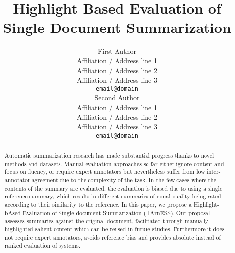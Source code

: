 \documentclass[11pt,a4paper]{article}
\title{Highlight Based Evaluation of Single Document Summarization}
\author{First Author \\
  Affiliation / Address line 1 \\
  Affiliation / Address line 2 \\
  Affiliation / Address line 3 \\
  {\tt email@domain} \\\And
  Second Author \\
  Affiliation / Address line 1 \\
  Affiliation / Address line 2 \\
  Affiliation / Address line 3 \\
  {\tt email@domain} \\}
\date{}
\begin{document}
\maketitle
\begin{abstract}
Automatic summarization research has made substantial progress thanks to novel methods and datasets. Manual evaluation approaches so far either ignore content and focus on fluency, or require expert annotators but nevertheless suffer from low inter-annotator agreement due to the complexity of the task. In the few cases where the contents of the summary are evaluated, the evaluation is biased due to using a single reference summary, which results in different summaries of equal quality being rated according to their similarity to the reference. In this paper, we propose a Highlight-bAsed Evaluation of Single document Summarization (HArnESS). Our proposal assesses summaries against the original document, facilitated through manually highlighted salient content which can be reused in future studies. Furthermore it does not require expert annotators, avoids reference bias and provides absolute instead of ranked evaluation of systems.




\end{abstract}
\end{document}
